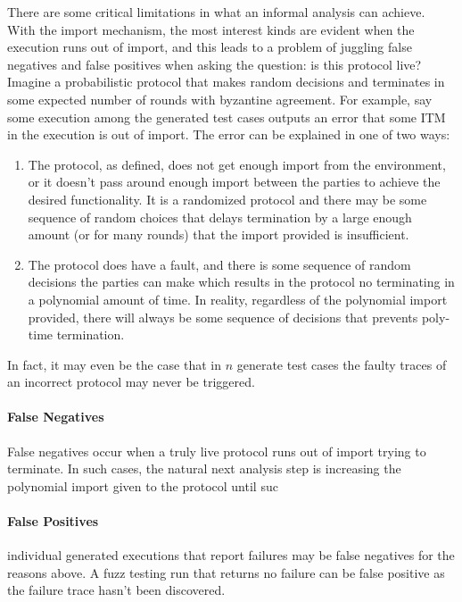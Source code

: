 There are some critical limitations in what an informal analysis can achieve.
With the import mechanism, the most interest kinds are evident when the execution runs out
of import, and this leads to a problem of juggling false negatives and false positives when
asking the question: is this protocol live?
Imagine a probabilistic protocol that makes random decisions
and terminates in some expected number of rounds with byzantine agreement. 
For example, say some execution among the generated test cases outputs an error
that some ITM in the execution is out of import. The error can be explained in one of 
two ways:
\begin{enumerate}
	\item The protocol, as defined, does not get enough import from the environment,  or it doesn't pass around enough import between the parties to achieve the desired functionality. It is a randomized protocol and there may be some sequence of random choices that delays termination by a large enough amount (or for many rounds) that the import provided is insufficient. 
	\item The protocol does have a fault, and there is some sequence of random decisions the parties can make which results in the protocol no terminating in a polynomial amount of time. In reality, regardless of the polynomial import provided, there will always be some sequence of decisions that prevents poly-time termination. 
\end{enumerate}
In fact, it may even be the case that in $n$ generate test cases the faulty traces of an incorrect protocol may never be triggered.  

\paragraph{False Negatives}
False negatives occur when a truly live protocol runs out of import trying to terminate. 
In such cases, the natural next analysis step is increasing the polynomial import given
to the protocol until suc 

\paragraph{False Positives}
individual generated executions that report failures may be false negatives for the reasons above.
A fuzz testing run that returns no failure can be false positive as the failure trace hasn't been discovered. 

